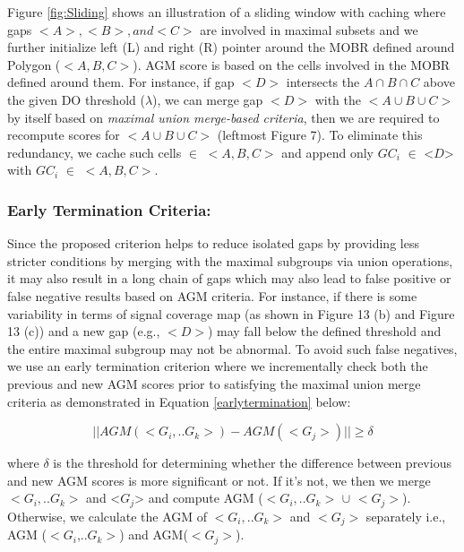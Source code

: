 \documentclass[twoside,leqno,onecolumn]{article}
\begin{document}
Figure \ref{fig:Sliding} shows an illustration of a sliding window with caching where gaps $<A>, <B>, and <C>$ are involved in maximal subsets and we further initialize left (L) and right (R) pointer around the MOBR defined around Polygon ($<A,B,C>$). AGM score is based on the cells involved in the MOBR defined around them. For instance, if gap $<D>$ intersects the $A \cap B \cap C$ above the given DO threshold ($\lambda$), we can merge gap $<D>$ with the $<A \cup B \cup C>$ by itself based on \textit{maximal union merge-based criteria}, then we are required to recompute scores for $<A \cup B \cup C>$ (leftmost Figure 7). To eliminate this redundancy, we cache such cells $\in$ $<A,B,C>$ and append only $GC_{i}$ $\in$ <$D$> with $GC_{i}$ $\in$ $<A,B,C>$.


\subsubsection{Early Termination Criteria:}
\label{subsubsection:Caching}

Since the proposed criterion helps to reduce isolated gaps by providing less stricter conditions by merging with the maximal subgroups via union operations, it may also result in a long chain of gaps which may also lead to false positive or false negative results based on AGM criteria. For instance, if there is some variability in terms of signal coverage map (as shown in Figure 13 (b) and Figure 13 (c)) and a new gap (e.g., $<D>$) may fall below the defined threshold and the entire maximal subgroup may not be abnormal. To avoid such false negatives, we use an early termination criterion where we incrementally check both the previous and new AGM scores prior to satisfying the maximal union merge criteria as demonstrated in Equation \ref{earlytermination} below: 

\begin{equation}
\label{earlytermination}
    || AGM (<G_{i},..G_{k}>) - AGM(<G_{j}>) || \geq \delta
\end{equation}

where $\delta$ is the threshold for determining whether the difference between previous and new AGM scores is more significant or not. If it's not, we then we merge $<G_{i},..G_{k}>$ and <$G_{j}$> and compute AGM ($<G_{i},..G_{k}>$ $\cup$ $<G_{j}>$). Otherwise, we calculate the AGM of $<G_{i},..G_{k}>$ and $<G_{j}>$ separately i.e., AGM ($<G_{i}$,..$G_{k}>$) and AGM($<G_{j}>$).\\
\end{document}
